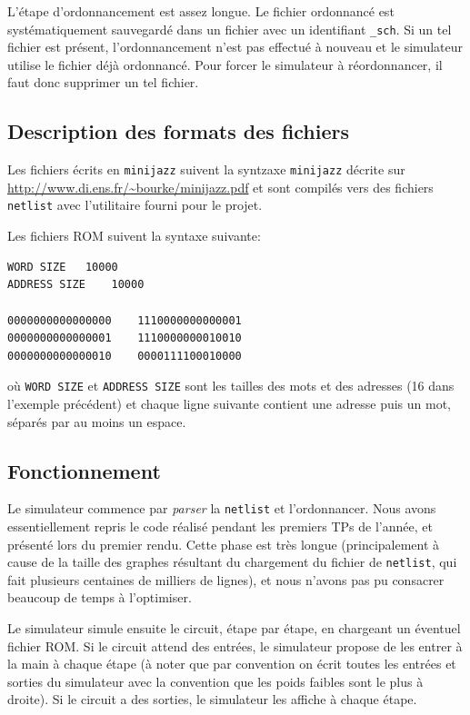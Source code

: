 \documentclass[11pt]{article}
\begin{document}
L'étape d'ordonnancement est assez longue. Le fichier ordonnancé est systématiquement sauvegardé dans un fichier avec un identifiant \texttt{\_sch}. Si un tel fichier est présent, l'ordonnancement n'est pas effectué à nouveau et le simulateur utilise le fichier déjà ordonnancé. Pour forcer le simulateur à réordonnancer, il faut donc supprimer un tel fichier.


\subsection{Description des formats des fichiers}

Les fichiers écrits en \texttt{minijazz} suivent la syntzaxe \texttt{minijazz} décrite sur \url{http://www.di.ens.fr/~bourke/minijazz.pdf} et sont compilés vers des fichiers \texttt{netlist} avec l'utilitaire fourni pour le projet.

Les fichiers ROM suivent la syntaxe suivante:
\begin{verbatim}
WORD SIZE	10000
ADDRESS SIZE	10000

0000000000000000	1110000000000001
0000000000000001	1110000000010010
0000000000000010	0000111100010000
\end{verbatim}
où \texttt{WORD SIZE} et \texttt{ADDRESS SIZE} sont les tailles des mots et des adresses (16 dans l'exemple précédent) et chaque ligne suivante contient une adresse puis un mot, séparés par au moins un espace.

\subsection{Fonctionnement}

Le simulateur commence par \emph{parser} la \texttt{netlist} et l'ordonnancer. Nous avons essentiellement repris le code réalisé pendant les premiers TPs de l'année, et présenté lors du premier rendu. Cette phase est très longue (principalement à cause de la taille des graphes résultant du chargement du fichier de \texttt{netlist}, qui fait plusieurs centaines de milliers de lignes), et nous n'avons pas pu consacrer beaucoup de temps à l'optimiser.

Le simulateur simule ensuite le circuit, étape par étape, en chargeant un éventuel fichier ROM. Si le circuit attend des entrées, le simulateur propose de les entrer à la main à chaque étape (à noter que par convention on écrit toutes les entrées et sorties du simulateur avec la convention que les poids faibles sont le plus à droite). Si le circuit a des sorties, le simulateur les affiche à chaque étape.
\end{document}
